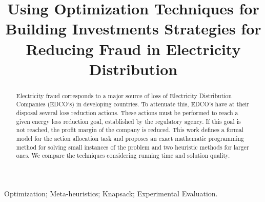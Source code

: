 \documentclass[10pt, conference, compsocconf]{IEEEtran}
\renewcommand*{\nameyeardelim}{\addspace}
\renewcommand*{\revsdnamedelim}{\addspace}
\begin{document}
\renewcommand*{\nameyeardelim}{\addspace}
\renewcommand*{\revsdnamedelim}{\addspace}
%
\title{Using Optimization Techniques for Building Investments Strategies for Reducing Fraud in Electricity Distribution}
                                                                                  

\author{
}



\listoftodos
\maketitle


\begin{abstract}
Electricity fraud corresponds to a major source of loss of Electricity
Distribution Companies (EDCO's) in developing countries. To attenuate this,
EDCO's have at their disposal several loss reduction actions. These actions
must be performed to reach a given energy loss reduction goal, established
by the regulatory agency. If this goal is not reached, the profit margin
of the company is reduced.
This work defines a formal model for the action allocation task 
and proposes an exact mathematic programming method for solving small instances of
the problem and two heuristic methods for larger ones. We compare
the techniques considering running time and solution quality.

\end{abstract}

\begin{IEEEkeywords}
Optimization; Meta-heuristics; Knapsack; Experimental Evaluation.
\end{IEEEkeywords}
\end{document}
